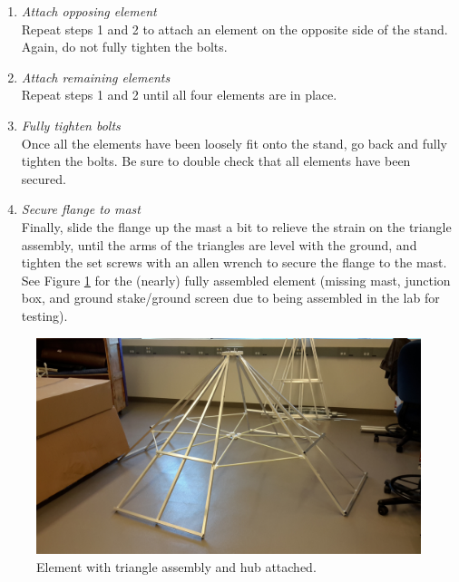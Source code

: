 \documentclass[12pt]{article}
\begin{document}
\begin{enumerate}
\begin{enumerate}
			\item \emph{Attach opposing element} \\ Repeat steps 1 and 2 to attach an element on the opposite side of the stand. Again, do not fully tighten the bolts.
			\item \emph{Attach remaining elements} \\ Repeat steps 1 and 2 until all four elements are in place.
			\item \emph{Fully tighten bolts} \\ Once all the elements have been loosely fit onto the stand, go back and fully tighten the bolts. Be sure to double check that all elements have been secured.
			\item \emph{Secure flange to mast} \\ Finally, slide the flange up the mast a bit to relieve the strain on the triangle assembly, until the arms of the triangles are level with the ground, and tighten the set screws with an allen wrench to secure the flange to the mast. See Figure \ref{AlmostCompleteElement} for the (nearly) fully assembled element (missing mast, junction box, and ground stake/ground screen due to being assembled in the lab for testing).
	\end{enumerate}

\begin{figure}
	\center
	\includegraphics[width=\linewidth]{20141125_112538.jpg}
	\caption{Element with triangle assembly and hub attached. \label{AlmostCompleteElement}}
\end{figure}
			
\end{enumerate}
\end{document}
